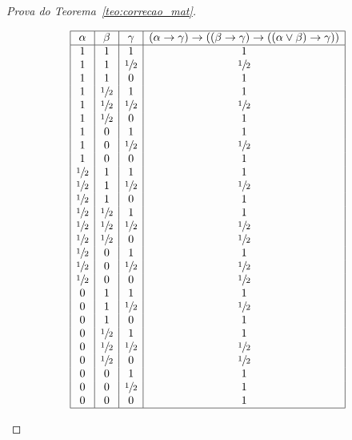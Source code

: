 \begin{proof}[Prova do Teorema~\ref{teo:correcao_mat}]
\begin{provaporcasos}
\begin{provaporsubcasos}
                \begin{center}
                    \[
                        \begin{array}{|c|c|c|c|}%
                            \hline%
                            \alpha      & \beta & \gamma & (\alpha \to \gamma) \to ((\beta \to \gamma) \to ((\alpha \lor \beta) \to \gamma)) \\
                            \hline%
                            1 & 1 & 1 &1\\
                            1 & 1 & \meio{} &\meio{}\\
                            1 & 1 & 0 &1\\
                            1 & \meio{} & 1 &1\\
                            1 & \meio{} & \meio{} &\meio{}\\
                            1 & \meio{} & 0 &1\\
                            1 & 0 & 1 &1\\
                            1 & 0 & \meio{} &\meio{}\\
                            1 & 0 & 0 &1\\
                            \meio{} & 1 & 1 &1\\
                            \meio{} & 1 & \meio{} &\meio{}\\
                            \meio{} & 1 & 0 &1\\
                            \meio{} & \meio{} & 1 &1\\
                            \meio{} & \meio{} & \meio{} &\meio{}\\
                            \meio{} & \meio{} & 0 &\meio{}\\
                            \meio{} & 0 & 1 &1\\
                            \meio{} & 0 & \meio{} &\meio{}\\
                            \meio{} & 0 & 0 &\meio{}\\
                            0 & 1 & 1 &1\\
                            0 & 1 & \meio{} &\meio{}\\
                            0 & 1 & 0 &1\\
                            0 & \meio{} & 1 &1\\
                            0 & \meio{} & \meio{} &\meio{}\\
                            0 & \meio{} & 0 &\meio{}\\
                            0 & 0 & 1 &1\\
                            0 & 0 & \meio{} &1\\
                            0 & 0 & 0 &1\\
                            \hline%
                        \end{array}
                    \]
                \end{center}


\end{provaporsubcasos}
\end{provaporcasos}
\end{proof}
